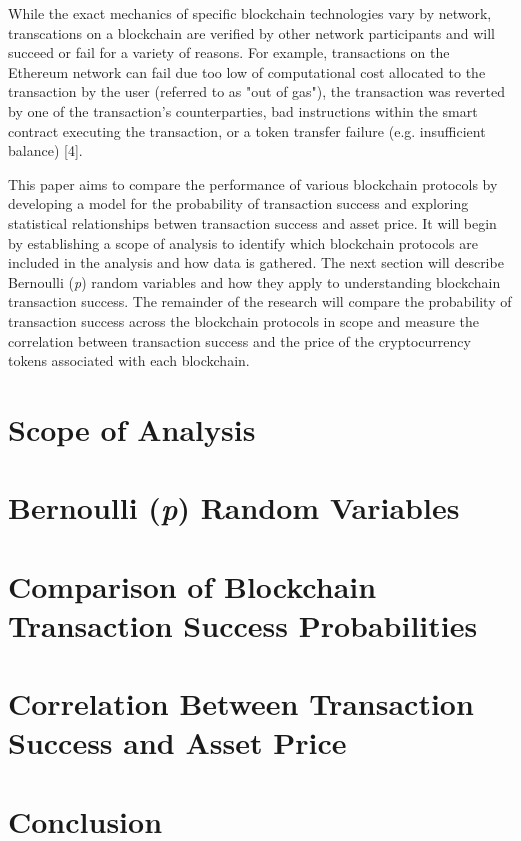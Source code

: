 \documentclass[12pt]{article}
\begin{document}
While the exact mechanics of specific blockchain technologies vary by network, transcations on a blockchain are verified by other network participants and will succeed or fail for a variety of reasons. For example, transactions on the Ethereum network can fail due too low of computational cost allocated to the transaction by the user (referred to as "out of gas"), the transaction was reverted by one of the transaction's counterparties, bad instructions within the smart contract executing the transaction, or a token transfer failure (e.g. insufficient balance) [4].

This paper aims to compare the performance of various blockchain protocols by developing a model for the probability of transaction success and exploring statistical relationships betwen transaction success and asset price. It will begin by establishing a scope of analysis to identify which blockchain protocols are included in the analysis and how data is gathered. The next section will describe Bernoulli (\emph{p}) random variables and how they apply to understanding blockchain transaction success. The remainder of the research will compare the probability of transaction success across the blockchain protocols in scope and measure the correlation between transaction success and the price of the cryptocurrency tokens associated with each blockchain.

\section{Scope of Analysis}

\section{Bernoulli (\emph{p}) Random Variables}

\section{Comparison of Blockchain Transaction Success Probabilities}

\section{Correlation Between Transaction Success and Asset Price}

\section{Conclusion}
\end{document}
